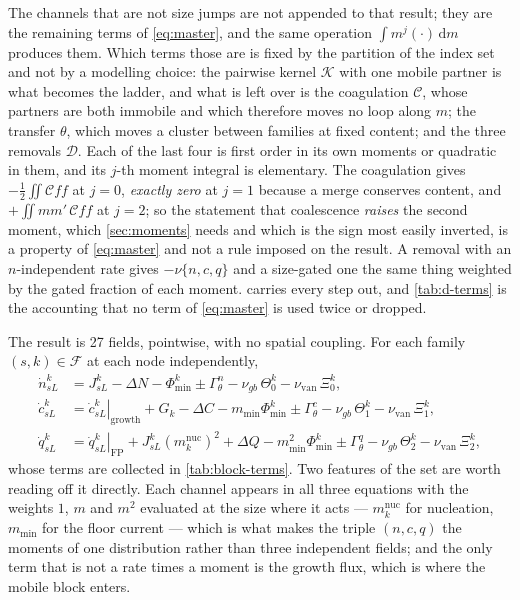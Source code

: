 The channels that are not size jumps are not appended to that result; they are
the remaining terms of \cref{eq:master}, and the same operation
$\int m^{j}(\cdot)\,\mathrm dm$ produces them. Which terms those are is fixed by
the partition of the index set and not by a modelling choice: the pairwise
kernel $\mathcal K$ with one mobile partner is what becomes the ladder, and
what is left over is the coagulation $\mathcal C$, whose partners are both
immobile and which therefore moves no loop along $m$; the transfer $\theta$,
which moves a cluster between families at fixed content; and the three removals
$\mathcal D$. Each of the last four is first order in its own moments or
quadratic in them, and its $j$-th moment integral is elementary. The coagulation
gives $-\tfrac12\iint\mathcal C f f$ at $j=0$, \emph{exactly zero} at $j=1$
because a merge conserves content, and $+\iint mm'\,\mathcal C f f$ at $j=2$;
so the statement that coalescence \emph{raises} the second moment, which
\cref{sec:moments} needs and which is the sign most easily inverted, is a
property of \cref{eq:master} and not a rule imposed on the result. A removal
with an $n$-independent rate gives $-\nu\{n,c,q\}$ and a size-gated one the same
thing weighted by the gated fraction of each moment. 
carries every step out, and \cref{tab:d-terms} is the accounting that no term of
\cref{eq:master} is used twice or dropped.

The result is 27 fields, pointwise, with no spatial coupling. For each family
$(s,k)\in\mathcal F$ at each node independently,
\begin{align}
  \dot n^k_{sL} &= J^k_{sL} - \Delta N - \Phi^k_{\min} \pm \Gamma^{n}_{\theta}
                   - \nu_{gb}\,\Theta^{k}_{0} - \nu_{\mathrm{van}}\,\Xi^{k}_{0},
  \label{eq:block-n}\\
  \dot c^k_{sL} &= \left.\dot c^k_{sL}\right|_{\mathrm{growth}}
                   + G_k - \Delta C - m_{\min}\Phi^k_{\min} \pm \Gamma^{c}_{\theta}
                   - \nu_{gb}\,\Theta^{k}_{1} - \nu_{\mathrm{van}}\,\Xi^{k}_{1},
  \label{eq:block-c}\\
  \dot q^k_{sL} &= \left.\dot q^k_{sL}\right|_{\mathrm{FP}}
                   + J^k_{sL}(m^{\mathrm{nuc}}_k)^{2} + \Delta Q
                   - m^{2}_{\min}\Phi^k_{\min}
                   \pm \Gamma^{q}_{\theta} - \nu_{gb}\,\Theta^{k}_{2}
                   - \nu_{\mathrm{van}}\,\Xi^{k}_{2},
  \label{eq:block-q}
\end{align}
whose terms are collected in \cref{tab:block-terms}. Two features of the set
are worth reading off it directly. Each channel appears in all three equations
with the weights $1$, $m$ and $m^{2}$ evaluated at the size where it acts ---
$m^{\mathrm{nuc}}_k$ for nucleation, $m_{\min}$ for the floor current --- which
is what makes the triple $(n,c,q)$ the moments of one distribution rather than
three independent fields; and the only term that is not a rate times a moment is
the growth flux, which is where the mobile block enters.

